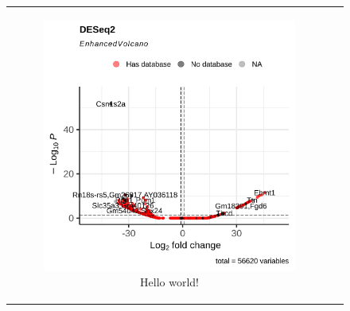 \begin{figure}[H] \begin{tabular}{cc}
        \begin{subfigure}{0.5\textwidth} \centering

            \includegraphics[width=\linewidth]{chapters/4_results_and_discussion/figures/dea/deseq2/tamoxifen/volcano.png}
            \caption{Hello world!
            }
            \label{fig:tamoxifen_volcano_deseq2}
        \end{subfigure}
        \begin{subfigure}{0.5\textwidth}
            \centering


\end{subfigure}
\end{tabular}
\end{figure}
